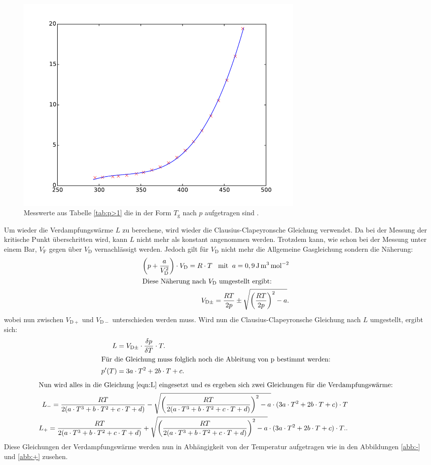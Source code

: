 \begin{figure}
  \centering
  \includegraphics[width=0.7\textwidth]{plot2.pdf}
  \caption{Messwerte aus Tabelle \ref{tab:p>1} die in der Form $T_\mathrm{g}$ nach $p$ aufgetragen sind .}
  \label{abb:plot2}
\end{figure}
\FloatBarrier
Um wieder die Verdampfungswärme $L$ zu berechene,
wird wieder die Clausius-Clapeyronsche Gleichung
verwendet. Da bei der Messung der kritische Punkt überschritten
wird, kann $L$ nicht mehr als konstant angenommen werden.
Trotzdem kann, wie schon bei der Messung unter einem Bar,
$V_\mathrm{F}$ gegen über $V_\mathrm{D}$ vernachlässigt werden.
Jedoch gilt für $V_\mathrm{D}$ nicht mehr die Allgemeine
Gasgleichung sondern die Näherung:
\begin{align}
\left(p+\frac{a}{V_\mathrm{D}^2}\right)\cdot V_\mathrm{D}=R\cdot T \; \; \; \text{mit} \;\; a=0,9\,\si{\joule\cubic\meter\per\mol\tothe{2}}\\
\intertext{Diese Näherung nach $V_\mathrm{D}$ umgestellt ergibt:}
V_{\mathrm{D\pm}}=\frac{RT}{2p}\pm\sqrt{\left(\frac{RT}{2p}\right)^2-a}.
\end{align}
wobei nun zwischen $V_\mathrm{D+}$ und  $V_\mathrm{D-}$ unterschieden werden muss.
Wird nun die Clausius-Clapeyronsche Gleichung nach $L$ umgestellt, ergibt sich:
\begin{align}
L&=V_\mathrm{D\pm}\cdot \frac{\delta p}{\delta T} \cdot T.\label{eqn:L}\\
\intertext{Für die Gleichung muss folglich noch die Ableitung von p bestimmt werden:}
p'(T)&=3a\cdot T^2+ 2b\cdot T + c.
\end{align}
\begin{align}
\intertext{Nun wird alles in die Gleichung \eqref{eqn:L} eingesetzt und es ergeben sich zwei Gleichungen für die Verdampfungswärme:}
L_-=\frac{RT}{2(a\cdot T^3+b\cdot T^2 + c\cdot T + d)}-\sqrt{\left(\frac{RT}{2(a\cdot T^3+b\cdot T^2 + c\cdot T + d)}\right)^2-a} \cdot (3a\cdot T^2+ 2b\cdot T + c )\cdot T\label{eqn:L-}\\
L_+=\frac{RT}{2(a\cdot T^3+b\cdot T^2 + c\cdot T + d)}+\sqrt{\left(\frac{RT}{2(a\cdot T^3+b\cdot T^2 + c\cdot T + d)}\right)^2-a} \cdot (3a\cdot T^2+ 2b\cdot T + c)\cdot T.\label{eqn:L+}.
\end{align}
Diese Gleichungen der Verdampfungswärme werden nun in Abhängigkeit
von der Temperatur aufgetragen wie in den Abbildungen \ref{abb:-} und \ref{abb:+}
zusehen.


